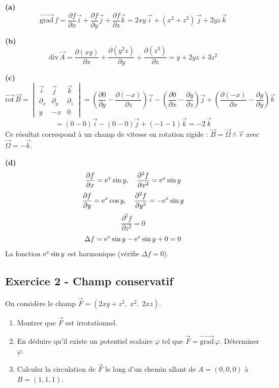 \documentclass[12pt,a4paper]{article}
\begin{document}
\begin{boitecorrige}
\textbf{(a)}
\[
\overrightarrow{\text{grad}}\,f = \frac{\partial f}{\partial x}\vec{i}+\frac{\partial f}{\partial y}\vec{j}+\frac{\partial f}{\partial z}\vec{k} = 2xy\,\vec{i} + (x^2+z^2)\,\vec{j} + 2yz\,\vec{k}
\]

\textbf{(b)}
\[
\text{div}\,\vec{A} = \frac{\partial(xy)}{\partial x}+\frac{\partial(y^2z)}{\partial y}+\frac{\partial(z^3)}{\partial z} = y + 2yz + 3z^2
\]

\textbf{(c)}
\[
\overrightarrow{\text{rot}}\,\vec{B} = \begin{vmatrix}\vec{i}&\vec{j}&\vec{k}\\\partial_x&\partial_y&\partial_z\\y&-x&0\end{vmatrix}
= \left(\frac{\partial 0}{\partial y}-\frac{\partial(-x)}{\partial z}\right)\vec{i} - \left(\frac{\partial 0}{\partial x}-\frac{\partial y}{\partial z}\right)\vec{j} + \left(\frac{\partial(-x)}{\partial x}-\frac{\partial y}{\partial y}\right)\vec{k}
\]
\[
= (0-0)\vec{i} - (0-0)\vec{j} + (-1-1)\vec{k} = -2\,\vec{k}
\]
Ce résultat correspond à un champ de vitesse en rotation rigide : $\vec{B} = \vec{\Omega}\wedge\vec{r}$ avec $\vec{\Omega}=-\vec{k}$.

\textbf{(d)}
\[
\frac{\partial f}{\partial x}=\mathrm{e}^x\sin y,\quad \frac{\partial^2 f}{\partial x^2}=\mathrm{e}^x\sin y
\]
\[
\frac{\partial f}{\partial y}=\mathrm{e}^x\cos y,\quad \frac{\partial^2 f}{\partial y^2}=-\mathrm{e}^x\sin y
\]
\[
\frac{\partial^2 f}{\partial z^2}=0
\]
\[
\Delta f = \mathrm{e}^x\sin y - \mathrm{e}^x\sin y + 0 = 0
\]
La fonction $\mathrm{e}^x\sin y$ est harmonique (vérifie $\Delta f=0$).
\end{boitecorrige}

\subsection*{Exercice 2 - Champ conservatif \niveau{\moyen}}

\begin{boiteexercice}
On considère le champ $\vec{F} = (2xy+z^2,\;x^2,\;2xz)$.
\begin{enumerate}
  \item Montrer que $\vec{F}$ est irrotationnel.
  \item En déduire qu'il existe un potentiel scalaire $\varphi$ tel que $\vec{F}=\overrightarrow{\text{grad}}\,\varphi$. Déterminer $\varphi$.
  \item Calculer la circulation de $\vec{F}$ le long d'un chemin allant de $A=(0,0,0)$ à $B=(1,1,1)$.
\end{enumerate}
\end{boiteexercice}
\end{document}
